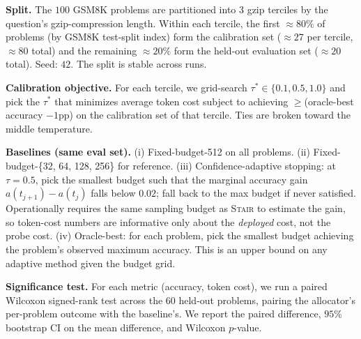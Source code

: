 \documentclass{article}
\newcommand{\method}{\textsc{Stair}}
\begin{document}
\textbf{Split.}  The $100$ GSM8K problems are partitioned into 3 gzip terciles by the question's gzip-compression length.  Within each tercile, the first $\approx\!80\%$ of problems (by GSM8K test-split index) form the calibration set ($\approx\!27$ per tercile, $\approx\!80$ total) and the remaining $\approx\!20\%$ form the held-out evaluation set ($\approx\!20$ total).  Seed: $42$.  The split is stable across runs.

\textbf{Calibration objective.}  For each tercile, we grid-search $\tau^* \in \{0.1, 0.5, 1.0\}$ and pick the $\tau^*$ that minimizes average token cost subject to achieving $\geq$(oracle-best accuracy $-1$pp) on the calibration set of that tercile.  Ties are broken toward the middle temperature.

\textbf{Baselines (same eval set).}  (i) Fixed-budget-512 on all problems.  (ii) Fixed-budget-\{32, 64, 128, 256\} for reference.  (iii) Confidence-adaptive stopping: at $\tau{=}0.5$, pick the smallest budget such that the marginal accuracy gain $a(t_{j+1})-a(t_j)$ falls below $0.02$; fall back to the max budget if never satisfied.  Operationally requires the same sampling budget as \method{} to estimate the gain, so token-cost numbers are informative only about the \emph{deployed} cost, not the probe cost.  (iv) Oracle-best: for each problem, pick the smallest budget achieving the problem's observed maximum accuracy.  This is an upper bound on any adaptive method given the budget grid.

\textbf{Significance test.}  For each metric (accuracy, token cost), we run a paired Wilcoxon signed-rank test across the $60$ held-out problems, pairing the allocator's per-problem outcome with the baseline's.  We report the paired difference, $95\%$ bootstrap CI on the mean difference, and Wilcoxon $p$-value.
\end{document}
